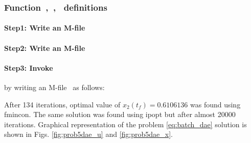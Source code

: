 \subsubsection{Function~,~,~  definitions}
\label{sec:example-fundef}

\paragraph{Step1: Write an M-file~}

{\small }

\paragraph{Step2: Write an M-file~}

{\small }

\paragraph{Step3: Invoke~} by writing an
M-file~ as follows:

{\small }

After 134 iterations, optimal value of $x_{2}(t_{f}) = 0.6106136$ was
found using fmincon. The same solution was found using ipopt but after
almost 20000 iterations. Graphical representation of the problem
\eqref{eq:batch_dae} solution is shown in Figs. \ref{fig:prob5dae_u}
and \ref{fig:prob5dae_x}.

